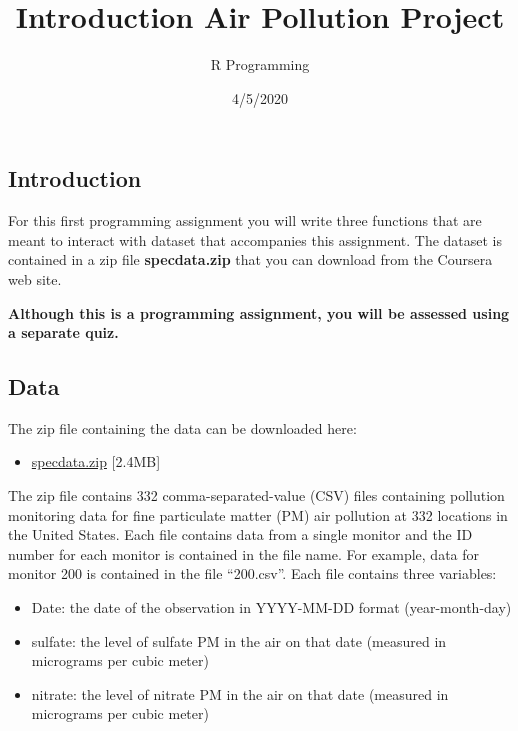 \documentclass[
]{article}
\title{Introduction Air Pollution Project}
\author{R Programming}
\date{4/5/2020}
\providecommand{\tightlist}{%
  \setlength{\itemsep}{0pt}\setlength{\parskip}{0pt}}
\begin{document}
\maketitle

\hypertarget{introduction}{%
\subsection{Introduction}\label{introduction}}

For this first programming assignment you will write three functions
that are meant to interact with dataset that accompanies this
assignment. The dataset is contained in a zip file \textbf{specdata.zip}
that you can download from the Coursera web site.

\textbf{Although this is a programming assignment, you will be assessed
using a separate quiz.}

\hypertarget{data}{%
\subsection{Data}\label{data}}

The zip file containing the data can be downloaded here:

\begin{itemize}
\tightlist
\item
  \href{https://d396qusza40orc.cloudfront.net/rprog\%2Fdata\%2Fspecdata.zip}{specdata.zip}
  {[}2.4MB{]}
\end{itemize}

The zip file contains 332 comma-separated-value (CSV) files containing
pollution monitoring data for fine particulate matter (PM) air pollution
at 332 locations in the United States. Each file contains data from a
single monitor and the ID number for each monitor is contained in the
file name. For example, data for monitor 200 is contained in the file
``200.csv''. Each file contains three variables:

\begin{itemize}
\tightlist
\item
  Date: the date of the observation in YYYY-MM-DD format
  (year-month-day)
\item
  sulfate: the level of sulfate PM in the air on that date (measured in
  micrograms per cubic meter)
\item
  nitrate: the level of nitrate PM in the air on that date (measured in
  micrograms per cubic meter)
\end{itemize}
\end{document}
